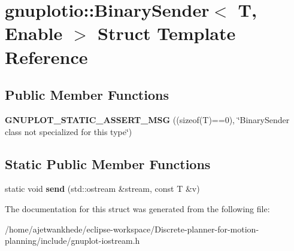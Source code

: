 \hypertarget{structgnuplotio_1_1BinarySender}{}\section{gnuplotio\+:\+:Binary\+Sender$<$ T, Enable $>$ Struct Template Reference}
\label{structgnuplotio_1_1BinarySender}
\subsection*{Public Member Functions}
\begin{DoxyCompactItemize}
\item 
\mbox{\label{structgnuplotio_1_1BinarySender_ad964fa720473ff517cfb461361f645c8}} 
{\bfseries G\+N\+U\+P\+L\+O\+T\+\_\+\+S\+T\+A\+T\+I\+C\+\_\+\+A\+S\+S\+E\+R\+T\+\_\+\+M\+SG} ((sizeof(T)==0), \char`\"{}Binary\+Sender class not specialized for this type\char`\"{})
\end{DoxyCompactItemize}
\subsection*{Static Public Member Functions}
\begin{DoxyCompactItemize}
\item 
\mbox{\label{structgnuplotio_1_1BinarySender_a4b5dd22b7679c4f0ce4d8e75b36c8a21}} 
static void {\bfseries send} (std\+::ostream \&stream, const T \&v)
\end{DoxyCompactItemize}


The documentation for this struct was generated from the following file\+:\begin{DoxyCompactItemize}
\item 
/home/ajetwankhede/eclipse-\/workspace/\+Discrete-\/planner-\/for-\/motion-\/planning/include/gnuplot-\/iostream.\+h\end{DoxyCompactItemize}
